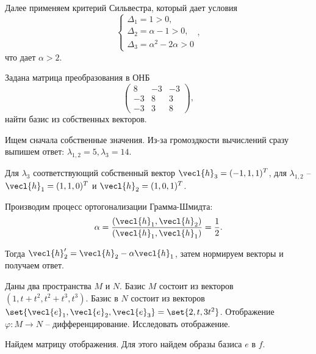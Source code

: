 Далее применяем критерий Сильвестра, который дает условия
\begin{equation*}
    \begin{cases}
        \Delta_1 = 1 > 0, \\ \Delta_2 = \alpha - 1 > 0, \\ \Delta_3 = \alpha^2 - 2\alpha > 0
    \end{cases},
\end{equation*}
что дает $\alpha > 2$.

\begin{task}
    Задана матрица преобразования в ОНБ
    \begin{equation*}
        \begin{pmatrix}
            8 & -3 & -3\\
            -3 & 8 & 3\\
            -3 & 3 & 8
        \end{pmatrix},
    \end{equation*}
    найти базис из собственных векторов.
\end{task}

Ищем сначала собственные значения. Из-за громоздкости вычислений сразу выпишем ответ: $\lambda_{1, 2} = 5, \lambda_3 = 14$. 

Для $\lambda_3$ соответствующий собственный вектор $\displaystyle \vecl{h}_3 = (-1, 1, 1)^T$, для $\lambda_{1, 2}$ -- $\vecl{h}_1 = (1, 1, 0)^T$ и $\vecl{h}_2 = (1, 0, 1)^T$.

Производим процесс ортогонализации Грамма-Шмидта:
\begin{equation*}
    \alpha = \frac{(\vecl{h}_1, \vecl{h}_2)}{(\vecl{h}_1, \vecl{h}_1)} = \frac{1}{2}.
\end{equation*}

Тогда $\vecl{h}_2' = \vecl{h}_2 - \alpha \vecl{h}_1$, затем нормируем векторы и получаем ответ.

\begin{task}
    Даны два пространства $M$ и $N$. Базис $M$ состоит из векторов $(1, t + t^2, t^2 + t^3, t^3)$. Базис в $N$ состоит из векторов $\set{\vecl{e}_1, \vecl{e}_2, \vecl{e}_3} = \set{2, t, 3t^2}$. Отображение $\varphi: M \to N$ -- дифференцирование. Исследовать отображение.
\end{task}

Найдем матрицу отображения. Для этого найдем образы базиса $e$ в $f$. 

